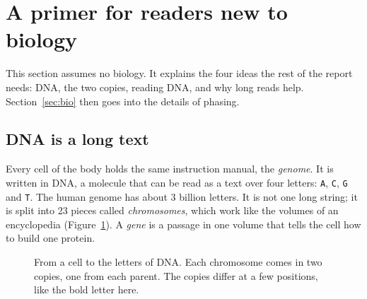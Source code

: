 \documentclass[11pt]{article}
\newcommand{\dna}[1]{\texttt{#1}}
\begin{document}
\section{A primer for readers new to biology}\label{sec:primer}

This section assumes no biology. It explains the four ideas the rest of the
report needs: DNA, the two copies, reading DNA, and why long reads help.
Section~\ref{sec:bio} then goes into the details of phasing.

\subsection{DNA is a long text}

Every cell of the body holds the same instruction manual, the
\emph{genome}. It is written in DNA, a molecule that can be read as a text
over four letters: \dna{A}, \dna{C}, \dna{G} and \dna{T}. The human genome
has about 3 billion letters. It is not one long string; it is split into 23
pieces called \emph{chromosomes}, which work like the volumes of an
encyclopedia (Figure~\ref{fig:cell}). A \emph{gene} is a passage in one
volume that tells the cell how to build one protein.

\begin{figure}[h]
\centering
{}
\caption{From a cell to the letters of DNA. Each chromosome comes in two
copies, one from each parent. The copies differ at a few positions, like the
bold letter here.}
\label{fig:cell}
\end{figure}
\end{document}
